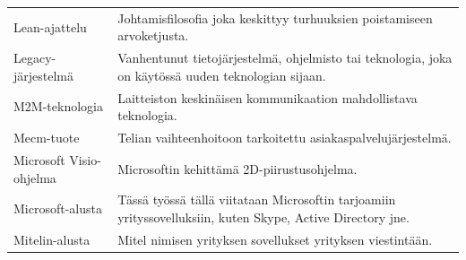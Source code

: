 \documentclass[finnish,12pt,a4paper,pdftex]{article}
\begin{document}
\begin{table}[h!]
\begin{tabular}{ p{5cm}  p{\textwidth-6cm} }
Lean-ajattelu               & Johtamisfilosofia joka keskittyy turhuuksien poistamiseen arvoketjusta.                                                                          \\[0.9em]
Legacy-järjestelmä         & Vanhentunut tietojärjestelmä, ohjelmisto tai teknologia, joka on käytössä uuden teknologian sijaan.                                              \\[0.9em]
M2M-teknologia              & Laitteiston keskinäisen kommunikaation mahdollistava teknologia.                                                                                 \\[0.9em]
Mecm-tuote                  & Telian vaihteenhoitoon tarkoitettu asiakaspalvelujärjestelmä.                                                                                    \\[0.9em]
Microsoft Visio-ohjelma     & Microsoftin kehittämä 2D-piirustusohjelma.                                                                                                       \\[0.9em]
Microsoft-alusta            & Tässä työssä tällä viitataan Microsoftin tarjoamiin yrityssovelluksiin, kuten Skype, Active Directory jne.                                       \\[0.9em]
Mitelin-alusta              & Mitel nimisen yrityksen sovellukset yrityksen viestintään.                                                                                       \\[0.9em]
                                                                                                                   
\end{tabular}
\end{table}
\end{document}
